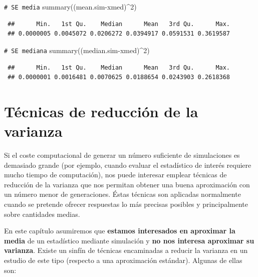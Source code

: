 \documentclass[
]{book}
\newenvironment{Shaded}{\begin{snugshade}}{\end{snugshade}}
\newcommand{\CommentTok}[1]{\textcolor[rgb]{0.56,0.35,0.01}{\textit{#1}}}
\newcommand{\DecValTok}[1]{\textcolor[rgb]{0.00,0.00,0.81}{#1}}
\newcommand{\FunctionTok}[1]{\textcolor[rgb]{0.00,0.00,0.00}{#1}}
\newcommand{\NormalTok}[1]{#1}
\newcommand{\SpecialCharTok}[1]{\textcolor[rgb]{0.00,0.00,0.00}{#1}}
\theoremstyle{break}
\theoremstyle{nonumberplain}
\renewcommand{\CommentTok}[1]{\textcolor[rgb]{0.41,0.41,0.41}{\texttt{#1}}}
\begin{document}
\begin{enumerate}
\begin{Shaded}
\begin{Highlighting}[]
\CommentTok{\# SE media}
\FunctionTok{summary}\NormalTok{((mean.sim}\SpecialCharTok{{-}}\NormalTok{xmed)}\SpecialCharTok{\^{}}\DecValTok{2}\NormalTok{) }
\end{Highlighting}
\end{Shaded}

\begin{verbatim}
 ##      Min.   1st Qu.    Median      Mean   3rd Qu.      Max. 
 ## 0.0000005 0.0045072 0.0206272 0.0394917 0.0591531 0.3619587
\end{verbatim}

\begin{Shaded}
\begin{Highlighting}[]
\CommentTok{\# SE mediana}
\FunctionTok{summary}\NormalTok{((median.sim}\SpecialCharTok{{-}}\NormalTok{xmed)}\SpecialCharTok{\^{}}\DecValTok{2}\NormalTok{) }
\end{Highlighting}
\end{Shaded}

\begin{verbatim}
 ##      Min.   1st Qu.    Median      Mean   3rd Qu.      Max. 
 ## 0.0000001 0.0016481 0.0070625 0.0188654 0.0243903 0.2618368
\end{verbatim}
\end{enumerate}

\hypertarget{red-varianza}{%
\chapter{Técnicas de reducción de la varianza}\label{red-varianza}}

Si el coste computacional de generar un número suficiente de simulaciones es demasiado grande (por ejemplo, cuando evaluar el estadístico de interés requiere mucho tiempo de computación), nos puede interesar emplear técnicas de reducción de la varianza que nos permitan obtener una buena aproximación con un número menor de generaciones. Éstas técnicas son aplicadas normalmente cuando se pretende ofrecer respuestas lo más precisas posibles y principalmente sobre cantidades medias.

En este capítulo asumiremos que \textbf{estamos interesados en aproximar la media} de un estadístico mediante simulación y \textbf{no nos interesa aproximar su varianza}.
Existe un sinfín de técnicas encaminadas a reducir la varianza en un estudio de este tipo (respecto a una aproximación estándar).
Algunas de ellas son:
\end{document}
